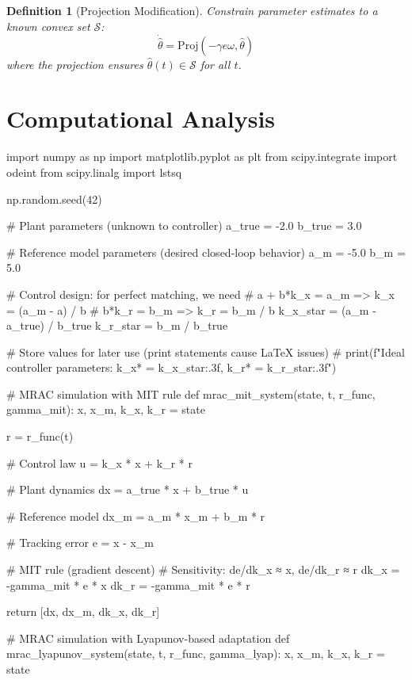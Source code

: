 \documentclass[a4paper, 11pt]{article}
\newtheorem{definition}{Definition}[section]
\begin{document}
\begin{definition}[Projection Modification]
Constrain parameter estimates to a known convex set $\mathcal{S}$:
\begin{equation}
\dot{\hat{\theta}} = \text{Proj}(-\gamma e \omega, \hat{\theta})
\end{equation}
where the projection ensures $\hat{\theta}(t) \in \mathcal{S}$ for all $t$.
\end{definition}

\section{Computational Analysis}

\begin{pycode}
import numpy as np
import matplotlib.pyplot as plt
from scipy.integrate import odeint
from scipy.linalg import lstsq

np.random.seed(42)

# Plant parameters (unknown to controller)
a_true = -2.0
b_true = 3.0

# Reference model parameters (desired closed-loop behavior)
a_m = -5.0
b_m = 5.0

# Control design: for perfect matching, we need
# a + b*k_x = a_m  =>  k_x = (a_m - a) / b
# b*k_r = b_m      =>  k_r = b_m / b
k_x_star = (a_m - a_true) / b_true
k_r_star = b_m / b_true

# Store values for later use (print statements cause LaTeX issues)
# print(f"Ideal controller parameters: k_x* = {k_x_star:.3f}, k_r* = {k_r_star:.3f}")

# MRAC simulation with MIT rule
def mrac_mit_system(state, t, r_func, gamma_mit):
    x, x_m, k_x, k_r = state

    r = r_func(t)

    # Control law
    u = k_x * x + k_r * r

    # Plant dynamics
    dx = a_true * x + b_true * u

    # Reference model
    dx_m = a_m * x_m + b_m * r

    # Tracking error
    e = x - x_m

    # MIT rule (gradient descent)
    # Sensitivity: de/dk_x ≈ x, de/dk_r ≈ r
    dk_x = -gamma_mit * e * x
    dk_r = -gamma_mit * e * r

    return [dx, dx_m, dk_x, dk_r]

# MRAC simulation with Lyapunov-based adaptation
def mrac_lyapunov_system(state, t, r_func, gamma_lyap):
    x, x_m, k_x, k_r = state


\end{pycode}
\end{document}
